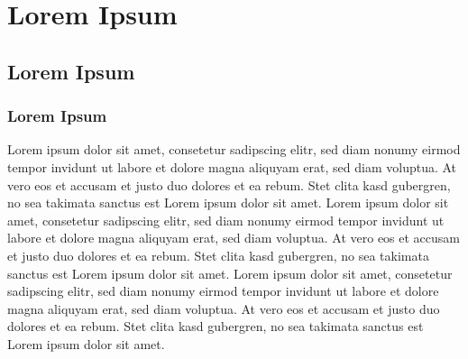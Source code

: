 \documentclass[11pt,openright,twoside]{report}
\newcommand{\LIMPAC}{
\newpage
\mbox{}
\thispagestyle{plain}
}
\numberwithin{equation}{chapter}
\begin{document}

\listoffigures
\LIMPAC


%


\newpage
\setcounter{page}{0}
\setcounter{page}{1}

\chapter{Lorem Ipsum}
\section{Lorem Ipsum}
\subsection{Lorem Ipsum}
Lorem ipsum dolor sit amet, consetetur sadipscing elitr, sed diam nonumy eirmod tempor invidunt ut labore et dolore magna aliquyam erat, sed diam voluptua. At vero eos et accusam et justo duo dolores et ea rebum. Stet clita kasd gubergren, no sea takimata sanctus est Lorem ipsum dolor sit amet. Lorem ipsum dolor sit amet, consetetur sadipscing elitr,  sed diam nonumy eirmod tempor invidunt ut labore et dolore magna aliquyam erat, sed diam voluptua. At vero eos et accusam et justo duo dolores et ea rebum. Stet clita kasd gubergren, no sea takimata sanctus est Lorem ipsum dolor sit amet. Lorem ipsum dolor sit amet, consetetur sadipscing elitr,  sed diam nonumy eirmod tempor invidunt ut labore et dolore magna aliquyam erat, sed diam voluptua. At vero eos et accusam et justo duo dolores et ea rebum. Stet clita kasd gubergren, no sea takimata sanctus est Lorem ipsum dolor sit amet.

%
%
%

%

%

\printglossary
\end{document}
